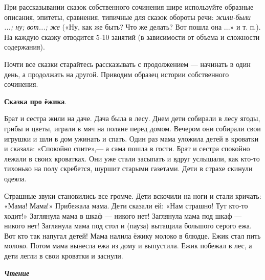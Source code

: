\documentclass{book}
\renewcommand{\emph}[1]{\textit{#1}}
\begin{document}
При рассказывании сказок собственного сочинения шире используйте
образные описания, эпитеты, сравнения, типичные для сказок обороты речи:
\emph{жили-были ...; ну; вот...; же} («Ну, как же быть? Что же делать?
Вот пошла она ...» и т. п.). На каждую сказку отводится 5-10 занятий (в
зависимости от объема и сложности содержания).

Почти все сказки старайтесь рассказывать с продолжением --- начинать в
один день, а продолжать на другой. Приводим образец истории собственного
сочинения.

\textbf{Сказка про ёжика}.

Брат и сестра жили на даче. Дача была в лесу. Днем дети собирали в лесу
ягоды, грибы и цветы, играли в мяч на поляне перед домом. Вечером они
собирали свои игрушки и шли в дом ужинать и спать. Один раз мама уложила
детей в кроватки и сказала: «Спокойно спите»,--- а сама пошла в гости.
Брат и сестра спокойно лежали в своих кроватках. Они уже стали засыпать
и вдруг услышали, как кто-то тихонько на полу скребется, шуршит старыми
газетами. Дети в страхе скинули одеяла.

Страшные звуки становились все громче. Дети вскочили на ноги и стали
кричать: «Мама! Мама!» Прибежала мама. Дети сказали ей: «Нам страшно!
Тут кто-то ходит!» Заглянула мама в шкаф --- никого нет! Заглянула мама
под шкаф --- никого нет! Заглянула мама под стол и (пауза) вытащила
большого серого ежа. Вот кто так напугал детей! Мама налила ёжику молоко
в блюдце. Ежик стал пить молоко. Потом мама вынесла ежа из дому и
выпустила. Ежик побежал в лес, а дети легли в свои кроватки и заснули.

\emph{\textbf{Чтение}}
\end{document}
